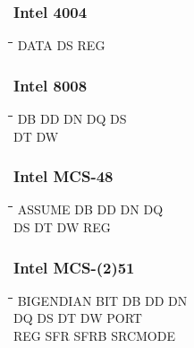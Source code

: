 \subsubsection{Intel 4004}
{\tt\begin{tabbing}
\hspace{3cm}\=\hspace{3cm}\=\hspace{3cm}\=\hspace{3cm}\=\kill   
DATA       \> DS          \> REG \\
\end{tabbing}}

\subsubsection{Intel 8008}
{\tt\begin{tabbing}
\hspace{3cm}\=\hspace{3cm}\=\hspace{3cm}\=\hspace{3cm}\=\kill    
DB         \> DD          \> DN          \> DQ          \> DS \\
DT         \> DW \\
\end{tabbing}}

\subsubsection{Intel MCS-48}
{\tt\begin{tabbing}
\hspace{3cm}\=\hspace{3cm}\=\hspace{3cm}\=\hspace{3cm}\=\kill
ASSUME     \> DB         \> DD          \> DN          \> DQ \\
DS         \> DT         \> DW          \> REG \\
\end{tabbing}}

\subsubsection{Intel MCS-(2)51}
{\tt\begin{tabbing}
\hspace{3cm}\=\hspace{3cm}\=\hspace{3cm}\=\hspace{3cm}\=\kill
BIGENDIAN  \> BIT         \> DB          \> DD          \> DN \\
DQ         \> DS          \> DT          \> DW          \> PORT \\
REG        \> SFR         \> SFRB        \> SRCMODE \\
\end{tabbing}}

